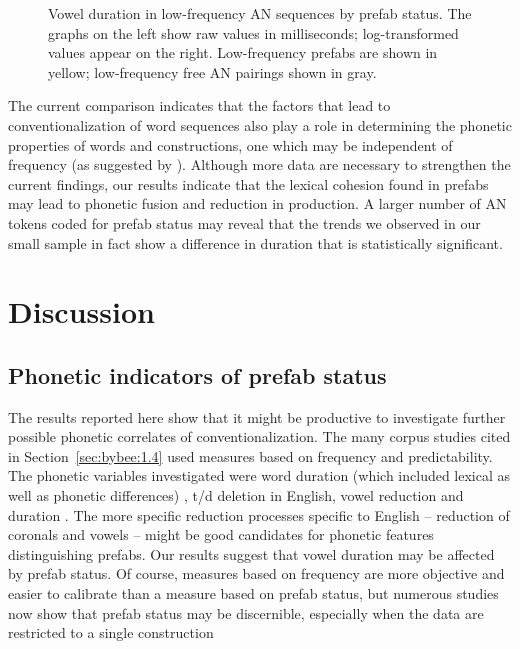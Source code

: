 \documentclass[output=paper]{langscibook}
\begin{document}
\begin{figure}

\caption{\label{fig:bybee:3}Vowel duration in low-frequency AN sequences by prefab status. The graphs on the left show raw values in milliseconds; log-transformed values appear on the right. Low-frequency prefabs are shown in yellow; low-frequency free AN pairings shown in gray.}
\end{figure}

The current comparison indicates that the factors that lead to conventionalization of word sequences also play a role in determining the phonetic properties of words and constructions, one which may be independent of frequency (as suggested by \citealt{DurrantDoherty2010}). Although more data are necessary to strengthen the current findings, our results indicate that the lexical cohesion found in prefabs may lead to phonetic fusion and reduction in production. A larger number of AN tokens coded for prefab status may reveal that the trends we observed in our small sample in fact show a difference in duration that is statistically significant.

\section{Discussion}
\subsection{Phonetic indicators of prefab status}

The results reported here show that it might be productive to investigate further possible phonetic correlates of conventionalization. The many corpus studies cited in Section~\ref{sec:bybee:1.4} used measures based on frequency and predictability. The phonetic variables investigated were word duration (which included lexical as well as phonetic differences) \citep{BellJurafsky2009,Seyfarth2014,SóskuthyHay2017}, t/d deletion in English, vowel reduction and duration \citep{JurafskyEtAl2001}. The more specific reduction processes specific to English -- reduction of coronals and vowels -- might be good candidates for phonetic features distinguishing prefabs. Our results suggest that vowel duration may be affected by prefab status. Of course, measures based on frequency are more objective and easier to calibrate than a measure based on prefab status, but numerous studies now show that prefab status may be discernible, especially when the data are restricted to a single construction
\end{document}
